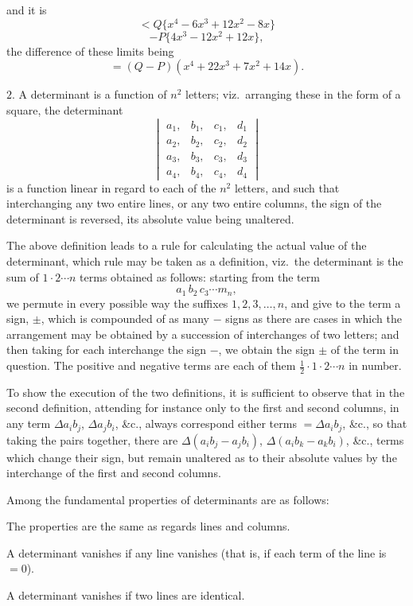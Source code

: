 \documentclass[11pt,a4paper]{book}
\begin{document}
\noindent
and it is
\[
< Q\{x^4 - 6x^3 + 12x^2 - 8x\}
\]
\[
- P\{4x^3 - 12x^2 + 12x\},
\]
the difference of these limits being
\[
= (Q - P)(x^4 + 22x^3 + 7x^2 + 14x).
\]

$2.$ A determinant is a function of $n^2$ letters; viz.\ arranging these in the form of
a square, the determinant
\[
\begin{vmatrix} a_1, & b_1, & c_1, & d_1 \\ a_2, & b_2, & c_2, & d_2 \\ a_3, & b_3, & c_3, & d_3 \\ a_4, & b_4, & c_4, & d_4 \end{vmatrix}
\]
is a function linear in regard to each of the $n^2$ letters, and such that interchanging
any two entire lines, or any two entire columns, the sign of the determinant is reversed,
its absolute value being unaltered.

The above definition leads to a rule for calculating the actual value of the determinant, which rule may be taken as a definition, viz.\ the determinant is the sum of
$1 \cdot 2 \cdots n$ terms obtained as follows: starting from the term
\[
a_1\,b_2\,c_3 \cdots m_n,
\]
we permute in every possible way the suffixes $1, 2, 3, \ldots, n$, and give to the term a
sign, $\pm$, which is compounded of as many $-$ signs as there are cases in which the arrangement may be obtained by a succession of interchanges of two letters; and then taking
for each interchange the sign $-$, we obtain the sign $\pm$ of the term in question. The
positive and negative terms are each of them $\tfrac{1}{2} \cdot 1 \cdot 2 \cdots n$ in number.

To show the execution of the two definitions, it is sufficient to observe that in
the second definition, attending for instance only to the first and second columns, in
any term $\Delta a_i b_j$, $\Delta a_j b_i$, \&c., always correspond either terms $= \Delta a_i b_j$, \&c., so
that taking the pairs together, there are $\Delta(a_i b_j - a_j b_i)$, $\Delta(a_i b_k - a_k b_i)$, \&c., terms
which change their sign, but remain unaltered as to their absolute values by the
interchange of the first and second columns.

Among the fundamental properties of determinants are as follows:

The properties are the same as regards lines and columns.

A determinant vanishes if any line vanishes (that is, if each term of the line is $= 0$).

A determinant vanishes if two lines are identical.
\end{document}

